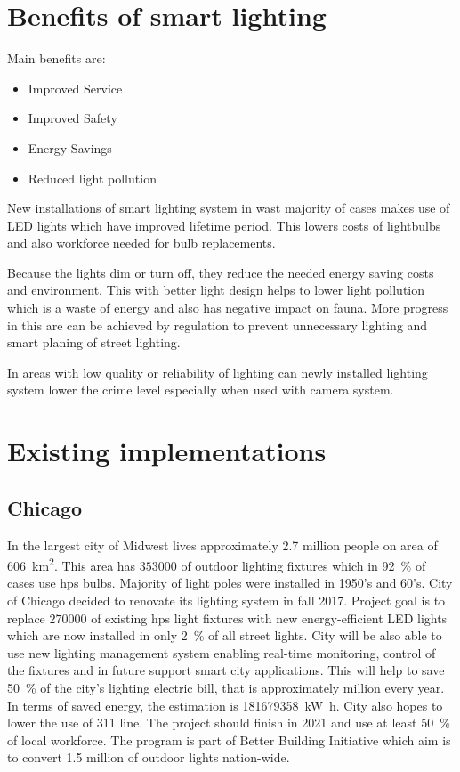 \documentclass[UKenglish,10pt,a4paper]{report}
\begin{document}
\section{Benefits of smart lighting}
Main benefits are:
\begin{itemize}
	\item Improved Service
	\item Improved Safety
	\item Energy Savings
	\item Reduced light pollution
\end{itemize}
New installations of smart lighting system in wast majority of cases makes use of LED lights which have improved lifetime period. This lowers costs of lightbulbs and also workforce needed for bulb replacements.

Because the lights dim or turn off, they reduce the needed energy saving costs and environment. This with better light design helps to lower light pollution which is a waste of energy and also has negative impact on fauna. More progress in this are can be achieved by regulation to prevent unnecessary lighting and smart planing of street lighting. 

In areas with low quality or reliability of lighting can newly installed lighting system lower the crime level especially when used with camera system.  
\section{Existing implementations}
\subsection{Chicago}
In the largest city of Midwest lives approximately 2.7 million people on area of \SI{606}{\square\kilo\meter}. This area has $353000$ of outdoor lighting fixtures which in \SI{92}{\percent} of cases use \gls{hps} bulbs. Majority of light poles were installed in 1950's and 60's. City of Chicago decided to renovate its lighting system in fall 2017. Project goal is to replace $270000$ of existing \gls{hps} light fixtures with new energy-efficient LED lights which are now installed in only \SI{2}{\percent} of all street lights. City will be also able to use new lighting management system enabling real-time monitoring, control of the fixtures and in future support smart city applications. This will help to save \SI{50}{\percent} of the city's lighting electric bill, that is approximately  million every year. In terms of saved energy, the estimation is \SI{181679358}{\kilo\watt\hour}. City also hopes to lower the use of 311 line. The project should finish in 2021 and use at least \SI{50}{\percent} of local workforce. The program is part of Better Building Initiative which aim is to convert 1.5 million of outdoor lights nation-wide.
\cite{chicago,chicago2}
\end{document}
